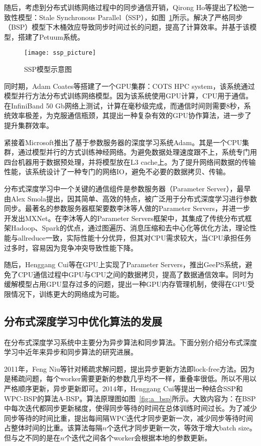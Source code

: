 随后，考虑到分布式训练网络过程中的同步通信开销，Qirong Ho等提出了松弛一致性模型：Stale Synchronous Parallel（SSP），如图~\ref{fig:ssp_picture}所示。解决了严格同步（BSP）模型下木桶效应导致同步时间过长的问题，提高了计算效率。并基于该模型，搭建了Petuum系统。

\begin{figure}[htp]
\centering
\texttt{[image: ssp\_picture]}
\caption{SSP模型示意图}
\label{fig:ssp_picture}
\end{figure}
同时期，Adam Coates等搭建了一个GPU集群：COTS HPC system，该系统通过模型并行方法分布式训练网络模型。因为该系统使用GPU计算，CPU用于通信。在InfiniBand 50 Gb网络上测试，计算在毫秒级完成，而通信时间则需要8秒，系统效率极差，为克服通信瓶颈，其提出一种复杂有效的GPU协作算法，进一步了提升集群效率。

紧接着Microsoft推出了基于参数服务器的深度学习系统Adam。其是一个CPU集群，通过模型并行的方式训练神经网络。为避免数据处理速度跟不上，系统专门用四台机器用于数据预处理，并将模型放在L3 cache上。为了提升网络间数据的传输性能，该系统设计了一种专门的网络IO，避免不必要的数据拷贝、传输。

分布式深度学习中一个关键的通信组件是参数服务器（Parameter Server），最早由Alex Smola提出，因其简单、高效的特点，被广泛用于分布式深度学习进行参数同步。最著名的参数服务器框架要数李沐等人做的Parameter Servers，并进一步开发出MXNet。在李沐等人的Parameter Servers框架中，其集成了传统分布式框架Hadoop、Spark的优点，通过图遍历、消息压缩和去中心化等优化方法，理论性能与allreduce一致，实际性能十分优异，但其对CPU需求较大，当CPU承担任务过多时，容易因为竞争冲突导致性能下降。

随后，Henggang Cui等在GPU上实现了Parameter Servers，推出GeePS系统，避免了CPU通信过程中GPU与CPU之间的数据拷贝，提高了数据通信效率。同时为缓解模型占用GPU显存过多的问题，提出一种GPU内存管理机制，使得在GPU受限情况下，训练更大的网络成为可能。
\subsection{分布式深度学习中优化算法的发展}
在分布式深度学习系统中主要分为异步算法和同步算法。下面分别介绍分布式深度学习中近年来异步和同步算法的研究进展。

2011年，Feng Niu等针对稀疏求解问题，提出异步更新方法即lock-free方法。因为是稀疏问题，每个worker需要更新的参数几乎均不一样，重叠率很低。所以不用以严格顺序更新，异步更新即可。2014年，Henggang Cui等提出一种结合SSP和WPC-BSP的算法A-BSP。算法原理图如图~\ref{fig:a_bsp}所示。大致内容为：在BSP中每次迭代都同步更新梯度，使得同步等待的时间在总体训练时间过长。为了减少同步等待的时间比重，提出每间隔WPC迭代才同步更新一次，减少同步等待时间占整体时间的比重。该算法每隔$n$个迭代才同步更新一次，等效于增大batch size。但与之不同的是在$n$个迭代之间各个worker会根据本地的参数更新。

